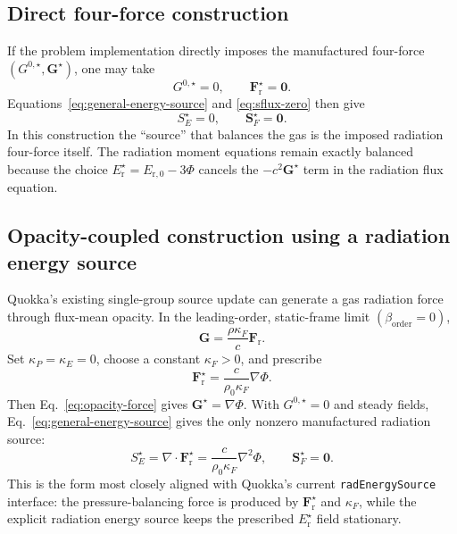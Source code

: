 \documentclass[11pt]{article}
\newcommand{\Div}{\nabla\!\cdot}
\newcommand{\Grad}{\nabla}
\newcommand{\Er}{E_{\mathrm r}}
\newcommand{\Fr}{\bm{F}_{\mathrm r}}
\newcommand{\Gmom}{\bm{G}}
\newcommand{\ShatE}{S_E}
\newcommand{\ShatF}{\bm{S}_F}
\newcommand{\Erzero}{E_{\mathrm r,0}}
\begin{document}
\subsection{Direct four-force construction}

If the problem implementation directly imposes the manufactured four-force
\((G^{0,\star},\Gmom^\star)\), one may take
\begin{equation}
  G^{0,\star}=0,\qquad
  \Fr^\star=\bm{0}.
  \label{eq:direct-force-rad-fields}
\end{equation}
Equations~\eqref{eq:general-energy-source} and \eqref{eq:sflux-zero} then give
\begin{equation}
  \boxed{\ShatE^\star=0,\qquad \ShatF^\star=\bm{0}.}
  \label{eq:direct-force-sources}
\end{equation}
In this construction the ``source'' that balances the gas is the imposed
radiation four-force itself.  The radiation moment equations remain exactly
balanced because the choice \(\Er^\star=\Erzero-3\Phi\) cancels the
\(-c^2\Gmom^\star\) term in the radiation flux equation.

\subsection{Opacity-coupled construction using a radiation energy source}

Quokka's existing single-group source update can generate a gas radiation force
through flux-mean opacity.  In the leading-order, static-frame limit
\((\beta_{\mathrm{order}}=0)\),
\begin{equation}
  \Gmom = \frac{\rho\kappa_F}{c}\Fr.
  \label{eq:opacity-force}
\end{equation}
Set \(\kappa_P=\kappa_E=0\), choose a constant
\(\kappa_F>0\), and prescribe
\begin{equation}
  \Fr^\star
  =
  \frac{c}{\rho_0\kappa_F}\Grad\Phi.
  \label{eq:flux-choice}
\end{equation}
Then Eq.~\eqref{eq:opacity-force} gives
\(\Gmom^\star=\Grad\Phi\).  With \(G^{0,\star}=0\) and steady fields,
Eq.~\eqref{eq:general-energy-source} gives the only nonzero manufactured
radiation source:
\begin{equation}
  \boxed{
  \ShatE^\star
  =
  \Div\Fr^\star
  =
  \frac{c}{\rho_0\kappa_F}\nabla^2\Phi,
  \qquad
  \ShatF^\star=\bm{0}.
  }
  \label{eq:energy-source-potential}
\end{equation}
This is the form most closely aligned with Quokka's current
\texttt{radEnergySource} interface: the pressure-balancing force is produced
by \(\Fr^\star\) and \(\kappa_F\), while the explicit radiation energy source
keeps the prescribed \(\Er^\star\) field stationary.
\end{document}

